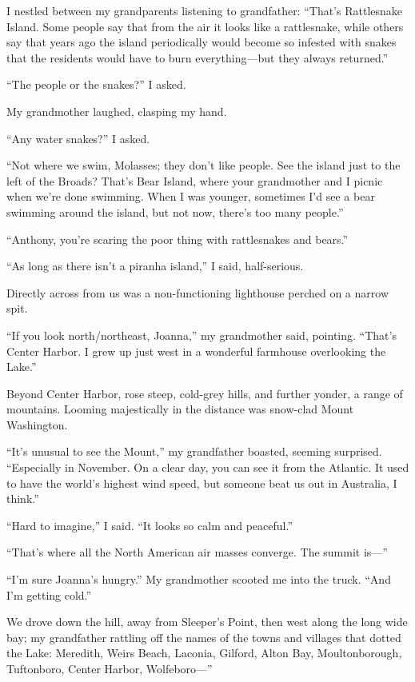 I nestled between my grandparents listening to grandfather: ``That's
Rattlesnake Island. Some people say that from the air it looks like a
rattlesnake, while others say that years ago the island periodically
would become so infested with snakes that the residents would have to
burn everything---but they always returned.''

``The people or the snakes?'' I asked.

My grandmother laughed, clasping my hand.

``Any water snakes?'' I asked.

``Not where we swim, Molasses; they don't like people. See the island
just to the left of the Broads? That's Bear Island, where your
grandmother and I picnic when we're done swimming. When I was younger,
sometimes I'd see a bear swimming around the island, but not now,
there's too many people.''

``Anthony, you're scaring the poor thing with rattlesnakes and bears.''

``As long as there isn't a piranha island,'' I said, half-serious.

Directly across from us was a non-functioning lighthouse perched on a
narrow spit.

``If you look north/northeast, Joanna,'' my grandmother said, pointing.
``That's Center Harbor. I grew up just west in a wonderful farmhouse
overlooking the Lake.''

Beyond Center Harbor, rose steep, cold-grey hills, and further yonder, a
range of mountains. Looming majestically in the distance was snow-clad
Mount Washington.

``It's unusual to see the Mount,'' my grandfather boasted, seeming
surprised. ``Especially in November. On a clear day, you can see it from
the Atlantic. It used to have the world's highest wind speed, but
someone beat us out in Australia, I think.''

``Hard to imagine,'' I said. ``It looks so calm and peaceful.''

``That's where all the North American air masses converge. The summit
is---''

``I'm sure Joanna's hungry.'' My grandmother scooted me into the truck.
``And I'm getting cold.''

We drove down the hill, away from Sleeper's Point, then west along the
long wide bay; my grandfather rattling off the names of the towns and
villages that dotted the Lake: Meredith, Weirs Beach, Laconia, Gilford,
Alton Bay, Moultonborough, Tuftonboro, Center Harbor, Wolfeboro---''


